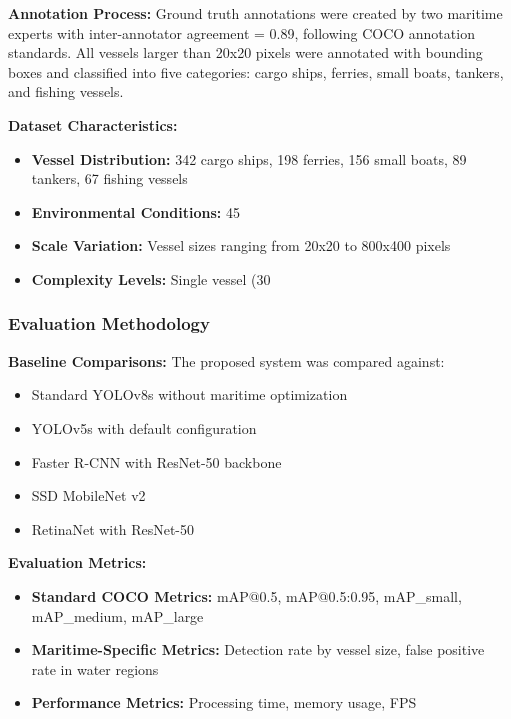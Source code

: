 \documentclass[a4paper,11pt]{article}
\begin{document}
\textbf{Annotation Process:} Ground truth annotations were created by two maritime experts with inter-annotator agreement \kappa = 0.89, following COCO annotation standards. All vessels larger than 20x20 pixels were annotated with bounding boxes and classified into five categories: cargo ships, ferries, small boats, tankers, and fishing vessels.

\textbf{Dataset Characteristics:}
\begin{itemize}
    \item \textbf{Vessel Distribution:} 342 cargo ships, 198 ferries, 156 small boats, 89 tankers, 67 fishing vessels
    \item \textbf{Environmental Conditions:} 45%
    \item \textbf{Scale Variation:} Vessel sizes ranging from 20x20 to 800x400 pixels
    \item \textbf{Complexity Levels:} Single vessel (30%
\end{itemize}

\subsubsection{Evaluation Methodology}

\textbf{Baseline Comparisons:} The proposed system was compared against:
\begin{itemize}
    \item Standard YOLOv8s without maritime optimization
    \item YOLOv5s with default configuration
    \item Faster R-CNN with ResNet-50 backbone
    \item SSD MobileNet v2
    \item RetinaNet with ResNet-50
\end{itemize}

\textbf{Evaluation Metrics:} 
\begin{itemize}
    \item \textbf{Standard COCO Metrics:} mAP@0.5, mAP@0.5:0.95, mAP\_small, mAP\_medium, mAP\_large
    \item \textbf{Maritime-Specific Metrics:} Detection rate by vessel size, false positive rate in water regions
    \item \textbf{Performance Metrics:} Processing time, memory usage, FPS
\end{itemize}
\end{document}
